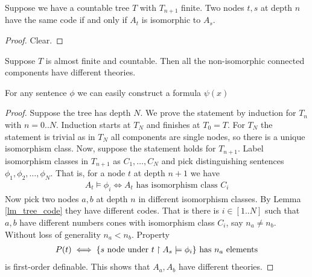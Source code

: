 \documentclass{amsart}
\begin{document}
\begin{Lemma} \label{lm_tree_code}
	Suppose we have a countable tree $T$ with $T_{n+1}$ finite. Two nodes $t,s$ at depth $n$ have the same code if and only if $A_t$ is isomorphic to $A_s$.
\end{Lemma}

\begin{proof}
	Clear.
\end{proof}

\begin{Lemma} \label{lm_categoricity}
	Suppose $T$ is almost finite and countable. Then all the non-isomorphic connected components have different theories.
\end{Lemma}

\begin{Note}
	For any sentence $\phi$ we can easily construct a formula $\psi(x)$
\end{Note}

\begin{proof}
	Suppose the tree has depth $N$. We prove the statement by induction for $T_n$ with $n = 0..N$. Induction starts at $T_N$ and finishes at $T_0 = T$. For $T_N$ the statement is trivial as in $T_N$ all components are single nodes, so there is a unique isomorphism class. Now, suppose the statement holds for $T_{n+1}$. Label isomorphism classes in $T_{n+1}$ as $C_1, \ldots, C_N$ and pick distinguishing sentences $\phi_1, \phi_2, \ldots, \phi_N$. That is, for a node $t$ at depth $n+1$ we have 
	\begin{align*}
		A_t \models \phi_i \iff A_t \text{ has isomorphism class } C_i
	\end{align*}
	Now pick two nodes $a,b$ at depth $n$ in different isomorphism classes. By Lemma \ref{lm_tree_code} they have different codes. That is there is $i \in [1..N]$ such that $a,b$ have different numbers cones with isomorphism class $C_i$, say $n_a \neq n_b$. Without loss of generality $n_a < n_b$. Property
	\begin{align*}
		P(t) \iff \{s \text{ node under $t$} \upharpoonright A_s \models \phi_i\} \text { has $n_a$ elements}
	\end{align*}
	is first-order definable. This shows that $A_a, A_b$ have different theories. 
\end{proof}
\end{document}
